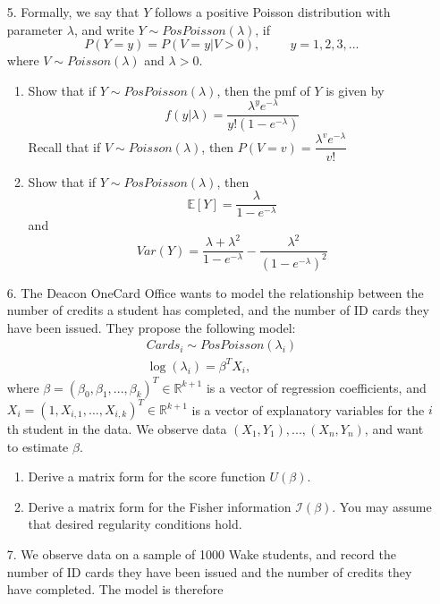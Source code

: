 \documentclass[11pt]{article}
\begin{document}
\begin{enumerate}
\item[5.] Formally, we say that $Y$ follows a positive Poisson distribution with parameter $\lambda$, and write $Y \sim PosPoisson(\lambda)$, if
$$P(Y = y) = P(V = y | V > 0), \hspace{1cm} y = 1, 2, 3, ...$$
where $V \sim Poisson(\lambda)$ and $\lambda > 0$.
\begin{enumerate}
\item Show that if $Y \sim PosPoisson(\lambda)$, then the pmf of $Y$ is given by
$$f(y|\lambda) = \frac{\lambda^y e^{-\lambda}}{y! (1 - e^{-\lambda})}$$
Recall that if $V \sim Poisson(\lambda)$, then $P(V = v) = \dfrac{\lambda^v e^{-\lambda}}{v!}$

\item Show that if $Y \sim PosPoisson(\lambda)$, then
$$\mathbb{E}[Y] = \frac{\lambda}{1 - e^{-\lambda}}$$
and
$$Var(Y) = \frac{\lambda + \lambda^2}{1 - e^{-\lambda}} - \frac{\lambda^2}{(1 - e^{-\lambda})^2}$$
\end{enumerate}

\item[6.] The Deacon OneCard Office wants to model the relationship between the number of credits a student has completed, and the number of ID cards they have been issued. They propose the following model:
\begin{align*}
Cards_i \sim PosPoisson(\lambda_i) \\
\log(\lambda_i) = \beta^T X_i,
\end{align*}
where $\beta = (\beta_0, \beta_1,...,\beta_k)^T \in \mathbb{R}^{k+1}$ is a vector of regression coefficients, and $X_i = (1, X_{i,1},...,X_{i,k})^T \in \mathbb{R}^{k+1}$ is a vector of explanatory variables for the $i$th student in the data. We observe data $(X_1, Y_1),...,(X_n, Y_n)$, and want to estimate $\beta$.

\begin{enumerate}
\item Derive a matrix form for the score function $U(\beta)$.

\item Derive a matrix form for the Fisher information $\mathcal{I}(\beta)$. You may assume that desired regularity conditions hold.
\end{enumerate}

\item[7.] We observe data on a sample of 1000 Wake students, and record the number of ID cards they have been issued and the number of credits they have completed. The model is therefore 


\end{enumerate}
\end{document}
